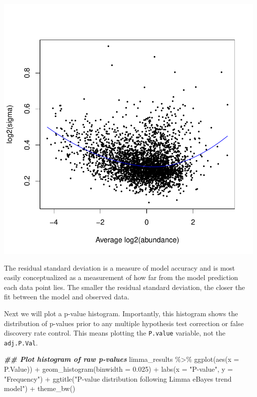 \documentclass[9pt,a4paper,]{extarticle}
\newenvironment{Shaded}{\begin{snugshade}}{\end{snugshade}}
\newcommand{\AttributeTok}[1]{\textcolor[rgb]{0.77,0.63,0.00}{#1}}
\newcommand{\DocumentationTok}[1]{\textcolor[rgb]{0.56,0.35,0.01}{\textbf{\textit{#1}}}}
\newcommand{\FloatTok}[1]{\textcolor[rgb]{0.00,0.00,0.81}{#1}}
\newcommand{\FunctionTok}[1]{\textcolor[rgb]{0.00,0.00,0.00}{#1}}
\newcommand{\NormalTok}[1]{#1}
\newcommand{\SpecialCharTok}[1]{\textcolor[rgb]{0.00,0.00,0.00}{#1}}
\newcommand{\StringTok}[1]{\textcolor[rgb]{0.31,0.60,0.02}{#1}}
\begin{document}
\begin{center}\includegraphics[height=0.3\textheight]{workflow_expressions_files/figure-latex/plotSA-1} \end{center}

The residual standard deviation is a measure of model accuracy and is most
easily conceptualized as a measurement of how far from the model prediction each
data point lies. The smaller the residual standard deviation, the closer the fit
between the model and observed data.

Next we will plot a p-value histogram. Importantly, this histogram shows the
distribution of p-values prior to any multiple hypothesis test correction or
false discovery rate control. This means plotting the \texttt{P.value} variable, not
the \texttt{adj.P.Val}.

\begin{Shaded}
\begin{Highlighting}[]
\DocumentationTok{\#\# Plot histogram of raw p{-}values}
\NormalTok{limma\_results }\SpecialCharTok{\%\textgreater{}\%}
  \FunctionTok{ggplot}\NormalTok{(}\FunctionTok{aes}\NormalTok{(}\AttributeTok{x =}\NormalTok{ P.Value)) }\SpecialCharTok{+}
  \FunctionTok{geom\_histogram}\NormalTok{(}\AttributeTok{binwidth =} \FloatTok{0.025}\NormalTok{) }\SpecialCharTok{+}
  \FunctionTok{labs}\NormalTok{(}\AttributeTok{x =} \StringTok{"P{-}value"}\NormalTok{, }\AttributeTok{y =} \StringTok{"Frequency"}\NormalTok{) }\SpecialCharTok{+}
  \FunctionTok{ggtitle}\NormalTok{(}\StringTok{"P{-}value distribution following Limma eBayes trend model"}\NormalTok{) }\SpecialCharTok{+}
  \FunctionTok{theme\_bw}\NormalTok{()}
\end{Highlighting}
\end{Shaded}
\end{document}
